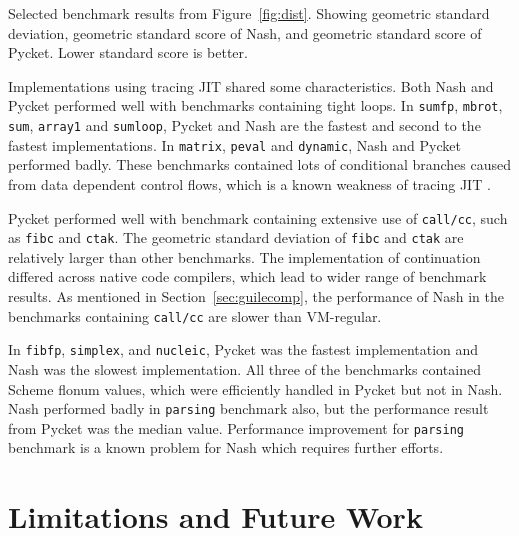 \documentclass[preprint, 10pt]{sigplanconf}
\begin{document}
\begin{table}
  \centering
  
  \caption{Selected benchmark results from
    Figure~\hyperref[fig:dist]{\ref{fig:dist}}. Showing geometric standard
    deviation, geometric standard score of Nash, and geometric standard score
    of Pycket. Lower standard score is better.}
\label{tab:tracingjits}
\end{table}

Implementations using tracing JIT shared some characteristics. Both Nash and
Pycket performed well with benchmarks containing tight loops. In
\texttt{sumfp}, \texttt{mbrot}, \texttt{sum}, \texttt{array1} and
\texttt{sumloop}, Pycket and Nash are the fastest and second to the fastest
implementations.  In \texttt{matrix}, \texttt{peval} and \texttt{dynamic},
Nash and Pycket performed badly. These benchmarks contained lots of
conditional branches caused from data dependent control flows, which is a
known weakness of tracing JIT \citep{bauman2015pycket}.

Pycket performed well with benchmark containing extensive use of
\texttt{call/cc}, such as \texttt{fibc} and \texttt{ctak}. The geometric
standard deviation of \texttt{fibc} and \texttt{ctak} are relatively larger
than other benchmarks. The implementation of continuation differed across
native code compilers, which lead to wider range of benchmark results. As
mentioned in Section~\ref{sec:guilecomp}, the performance of Nash in the
benchmarks containing \texttt{call/cc} are slower than VM-regular.

In \texttt{fibfp}, \texttt{simplex}, and \texttt{nucleic}, Pycket was the
fastest implementation and Nash was the slowest implementation. All three of
the benchmarks contained Scheme flonum values, which were efficiently handled
in Pycket but not in Nash.  Nash performed badly in \texttt{parsing} benchmark
also, but the performance result from Pycket was the median value. Performance
improvement for \texttt{parsing} benchmark is a known problem for Nash which
requires further efforts.



\section{Limitations and Future Work}
\label{sec:future}
\end{document}
